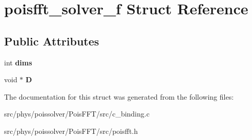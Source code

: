 \hypertarget{structpoisfft__solver__f}{}\section{poisfft\+\_\+solver\+\_\+f Struct Reference}
\label{structpoisfft__solver__f}
\subsection*{Public Attributes}
\begin{DoxyCompactItemize}
\item 
int {\bfseries dims}\hypertarget{structpoisfft__solver__f_aa6975f76c99d58b0bb03ad087a32233b}{}\label{structpoisfft__solver__f_aa6975f76c99d58b0bb03ad087a32233b}

\item 
void $\ast$ {\bfseries D}\hypertarget{structpoisfft__solver__f_a75895b8d112bb452831d5b0dc2dacdd7}{}\label{structpoisfft__solver__f_a75895b8d112bb452831d5b0dc2dacdd7}

\end{DoxyCompactItemize}


The documentation for this struct was generated from the following files\+:\begin{DoxyCompactItemize}
\item 
src/phys/poissolver/\+Pois\+F\+F\+T/src/c\+\_\+binding.\+c\item 
src/phys/poissolver/\+Pois\+F\+F\+T/src/poisfft.\+h\end{DoxyCompactItemize}
